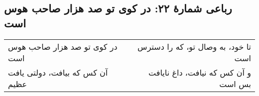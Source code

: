 \begin{center}
\section*{رباعی شمارهٔ ۲۲:  در کوی تو صد هزار صاحب هوس است}
\label{sec:022}
\begin{longtable}{l p{0.5cm} r}
 در کوی تو صد هزار صاحب هوس است
&&
تا خود، به وصال تو، که را دسترس است
\\
آن کس که بیافت، دولتی یافت عظیم
&&
و آن کس که نیافت، داغ نایافت بس است
\\
\end{longtable}
\end{center}
